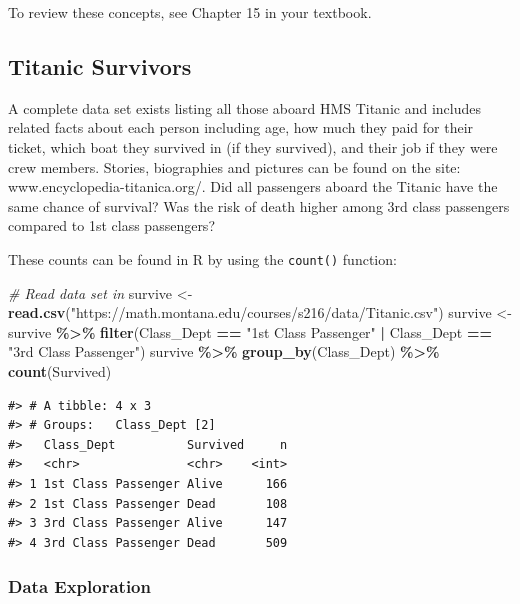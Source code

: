 \documentclass[
]{report}
\newenvironment{Shaded}{\begin{snugshade}}{\end{snugshade}}
\newcommand{\CommentTok}[1]{\textcolor[rgb]{0.56,0.35,0.01}{\textit{#1}}}
\newcommand{\FunctionTok}[1]{\textcolor[rgb]{0.13,0.29,0.53}{\textbf{#1}}}
\newcommand{\NormalTok}[1]{#1}
\newcommand{\OtherTok}[1]{\textcolor[rgb]{0.56,0.35,0.01}{#1}}
\newcommand{\SpecialCharTok}[1]{\textcolor[rgb]{0.81,0.36,0.00}{\textbf{#1}}}
\newcommand{\StringTok}[1]{\textcolor[rgb]{0.31,0.60,0.02}{#1}}
\begin{document}
To review these concepts, see Chapter 15 in your textbook.

\hypertarget{titanic-survivors}{%
\subsection{Titanic Survivors}\label{titanic-survivors}}

A complete data set exists listing all those aboard HMS Titanic and includes related facts about each person including age, how much they paid for their ticket, which boat they survived in (if they survived), and their job if they were crew members. Stories, biographies and pictures can be found on the site: www.encyclopedia-titanica.org/. Did all passengers aboard the Titanic have the same chance of survival? Was the risk of death higher among 3rd class passengers compared to 1st class passengers?

These counts can be found in R by using the \texttt{count()} function:

\begin{Shaded}
\begin{Highlighting}[]
\CommentTok{\# Read data set in}
\NormalTok{survive }\OtherTok{\textless{}{-}} \FunctionTok{read.csv}\NormalTok{(}\StringTok{"https://math.montana.edu/courses/s216/data/Titanic.csv"}\NormalTok{)}
\NormalTok{survive }\OtherTok{\textless{}{-}}\NormalTok{ survive }\SpecialCharTok{\%\textgreater{}\%}
  \FunctionTok{filter}\NormalTok{(Class\_Dept }\SpecialCharTok{==} \StringTok{"1st Class Passenger"} \SpecialCharTok{|}\NormalTok{ Class\_Dept }\SpecialCharTok{==} \StringTok{"3rd Class Passenger"}\NormalTok{)}
\NormalTok{survive }\SpecialCharTok{\%\textgreater{}\%} \FunctionTok{group\_by}\NormalTok{(Class\_Dept) }\SpecialCharTok{\%\textgreater{}\%} \FunctionTok{count}\NormalTok{(Survived)}
\end{Highlighting}
\end{Shaded}

\begin{verbatim}
#> # A tibble: 4 x 3
#> # Groups:   Class_Dept [2]
#>   Class_Dept          Survived     n
#>   <chr>               <chr>    <int>
#> 1 1st Class Passenger Alive      166
#> 2 1st Class Passenger Dead       108
#> 3 3rd Class Passenger Alive      147
#> 4 3rd Class Passenger Dead       509
\end{verbatim}

\hypertarget{data-exploration}{%
\subsubsection*{Data Exploration}\label{data-exploration}}
\end{document}
